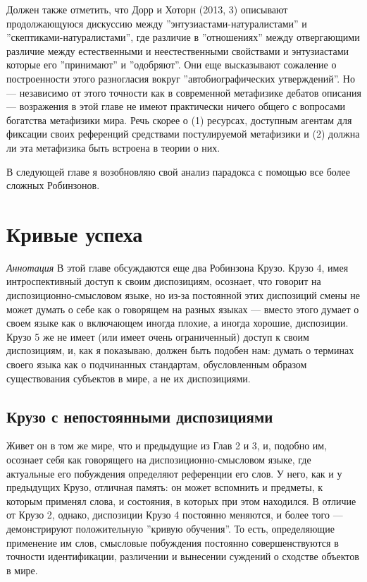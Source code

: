 \documentclass[11pt]{book}
\begin{document}
Должен также отметить, что Дорр и Хоторн (2013, 3) описывают продолжающуюся дискуссию между ''энтузиастами-натуралистами'' и ''скептиками-натуралистами'', где различие в ''отношениях'' между отвергающими различие между естественными и неестественными свойствами и энтузиастами которые его ''принимают'' и ''одобряют''. Они еще высказывают сожаление о построенности этого разногласия вокруг ''автобиографических утверждений''. Но --- независимо от этого точности как в современной метафизике дебатов описания --- возражения в этой главе не имеют практически ничего общего с вопросами богатства метафизики мира. Речь скорее о (1) ресурсах, доступным агентам для фиксации своих референций средствами постулируемой метафизики и (2) должна ли эта метафизика быть встроена в теории о них.

В следующей главе я возобновляю свой анализ парадокса с помощью все более сложных Робинзонов.

\chapter{Кривые успеха}

\qquad

\textit{Аннотация} \quad В этой главе обсуждаются еще два Робинзона Крузо. Крузо 4, имея интроспективный доступ к своим диспозициям, осознает, что говорит на диспозиционно-смысловом языке, но из-за постоянной этих диспозиций смены не может думать о себе как о говорящем на разных языках --- вместо этого думает о своем языке как о включающем иногда плохие, а иногда хорошие, диспозиции. Крузо 5 же не имеет (или имеет очень ограниченный) доступ к своим диспозициям, и, как я показываю, должен быть подобен нам: думать о терминах своего языка как о подчинанных стандартам, обусловленным образом существования субъектов в мире, а не их диспозициями.

\qquad

\section{Крузо с непостоянными диспозициями}

Живет он в том же мире, что и предыдущие из Глав 2 и 3, и, подобно им, осознает себя как говорящего на диспозиционно-смысловом языке, где актуальные его побуждения определяют референции его слов. У него, как и у предыдущих Крузо, отличная память: он может вспомнить и предметы, к которым применял слова, и состояния, в которых при этом находился. В отличие от Крузо 2, однако, диспозиции Крузо 4 постоянно меняются, и более того --- демонстрируют положительную ''кривую обучения''. То есть, определяющие применение им слов, смысловые побуждения постоянно совершенствуются в точности идентификации, различении и вынесении суждений о сходстве объектов в мире.
\end{document}

